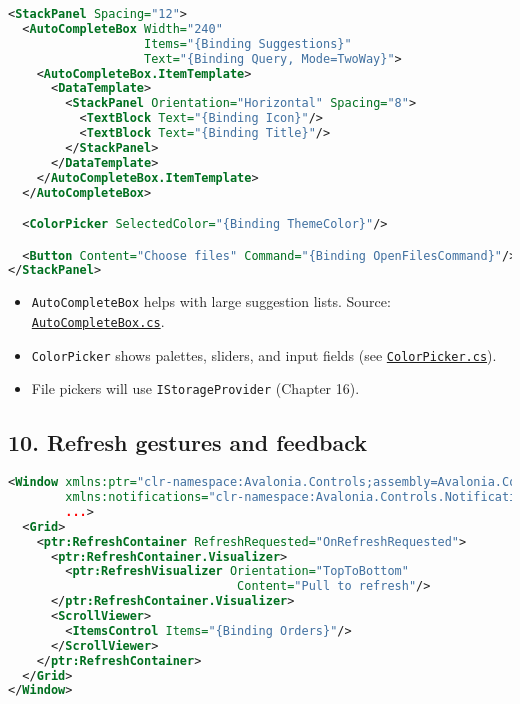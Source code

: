 \begin{lstlisting}[language=XML]
<StackPanel Spacing="12">
  <AutoCompleteBox Width="240"
                   Items="{Binding Suggestions}"
                   Text="{Binding Query, Mode=TwoWay}">
    <AutoCompleteBox.ItemTemplate>
      <DataTemplate>
        <StackPanel Orientation="Horizontal" Spacing="8">
          <TextBlock Text="{Binding Icon}"/>
          <TextBlock Text="{Binding Title}"/>
        </StackPanel>
      </DataTemplate>
    </AutoCompleteBox.ItemTemplate>
  </AutoCompleteBox>

  <ColorPicker SelectedColor="{Binding ThemeColor}"/>

  <Button Content="Choose files" Command="{Binding OpenFilesCommand}"/>
</StackPanel>
\end{lstlisting}

\begin{itemize}
\tightlist
\item
  \passthrough{\lstinline!AutoCompleteBox!} helps with large suggestion
  lists. Source:
  \href{https://github.com/AvaloniaUI/Avalonia/blob/master/src/Avalonia.Controls/AutoCompleteBox/AutoCompleteBox.cs}{\passthrough{\lstinline!AutoCompleteBox.cs!}}.
\item
  \passthrough{\lstinline!ColorPicker!} shows palettes, sliders, and
  input fields (see
  \href{https://github.com/AvaloniaUI/Avalonia/blob/master/src/Avalonia.Controls.ColorPicker/ColorPicker.cs}{\passthrough{\lstinline!ColorPicker.cs!}}).
\item
  File pickers will use \passthrough{\lstinline!IStorageProvider!}
  (Chapter 16).
\end{itemize}

\subsection{10. Refresh gestures and
feedback}\label{refresh-gestures-and-feedback}

\begin{lstlisting}[language=XML]
<Window xmlns:ptr="clr-namespace:Avalonia.Controls;assembly=Avalonia.Controls"
        xmlns:notifications="clr-namespace:Avalonia.Controls.Notifications;assembly=Avalonia.Controls"
        ...>
  <Grid>
    <ptr:RefreshContainer RefreshRequested="OnRefreshRequested">
      <ptr:RefreshContainer.Visualizer>
        <ptr:RefreshVisualizer Orientation="TopToBottom"
                                Content="Pull to refresh"/>
      </ptr:RefreshContainer.Visualizer>
      <ScrollViewer>
        <ItemsControl Items="{Binding Orders}"/>
      </ScrollViewer>
    </ptr:RefreshContainer>
  </Grid>
</Window>
\end{lstlisting}

